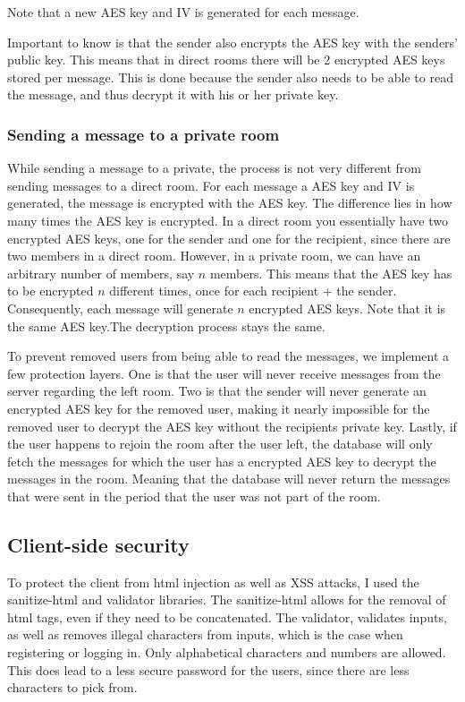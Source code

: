 \documentclass[a4paper]{article}
\begin{document}
Note that a new AES key and IV is generated for each message.

Important to know is that the sender also encrypts the AES key with the senders' public key. This means that in direct rooms there will be 2 encrypted AES keys stored per message. This is done because the sender also needs to be able to read the message, and thus decrypt it with his or her private key.
\subsubsection{Sending a message to a private room}
While sending a message to a private, the process is not very different from sending messages to a direct room. For each message a AES key and IV is generated, the message is encrypted with the AES key. The difference lies in how many times the AES key is encrypted. In a direct room you essentially have two encrypted AES keys, one for the sender and one for the recipient, since there are two members in a direct room. However, in a private room, we can have an arbitrary number of members, say \(n\) members. This means that the AES key has to be encrypted \(n\) different times, once for each recipient + the sender. Consequently, each message will generate \(n\) encrypted AES keys. Note that it is the same AES key.The decryption process stays the same.

To prevent removed users from being able to read the messages, we implement a few protection layers. One is that the user will never receive messages from the server regarding the left room. Two is that the sender will never generate an encrypted AES key for the removed user, making it nearly impossible for the removed user to decrypt the AES key without the recipients private key. Lastly, if the user happens to rejoin the room after the user left, the database will only fetch the messages for which the user has a encrypted AES key to decrypt the messages in the room. Meaning that the database will never return the messages that were sent in the period that the user was not part of the room.

\subsection{Client-side security}
To protect the client from html injection as well as XSS attacks, I used the sanitize-html and validator libraries. The sanitize-html allows for the removal of html tags, even if they need to be concatenated. The validator, validates inputs, as well as removes illegal characters from inputs, which is the case when registering or logging in. Only alphabetical characters and numbers are allowed. This does lead to a less secure password for the users, since there are less characters to pick from.
\end{document}
